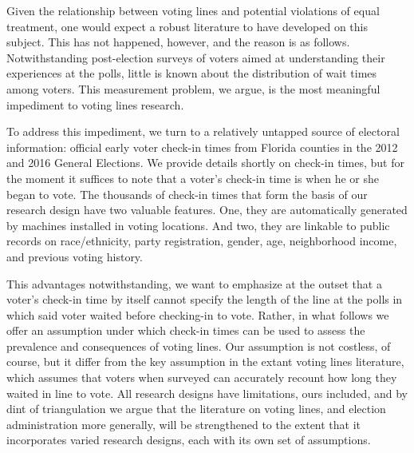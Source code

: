 \documentclass[12pt,titlepage]{article}
\begin{document}
Given the relationship between voting lines and potential violations
of equal treatment, one would expect a robust literature to
have developed on this subject.  This has not happened, however, and
the reason is as follows. Notwithstanding post-election surveys of
voters aimed at understanding their experiences at the polls, little
is known about the distribution of wait times among voters. This
measurement problem, we argue, is the most meaningful impediment to
voting lines research.

To address this impediment, we turn to a relatively untapped source of
electoral information: official early voter check-in times from
Florida counties in the 2012 and 2016 General Elections. We provide
details shortly on check-in times, but for the moment it suffices to
note that a voter's check-in time is when he or she began to vote. The
thousands of check-in times that form the basis of our research design
have two valuable features. One, they are automatically generated by
machines installed in voting locations. And two, they are linkable to
public records on race/ethnicity, party registration, gender, age,
neighborhood income, and previous voting history.

This advantages notwithstanding, we want to emphasize at the outset
that a voter's check-in time by itself cannot specify the length of
the line at the polls in which said voter waited before checking-in to
vote. Rather, in what follows we offer an assumption under which
check-in times can be used to assess the prevalence and consequences
of voting lines. Our assumption is not costless, of course, but it
differ from the key assumption in the extant voting lines literature,
which assumes that voters when surveyed can accurately recount how
long they waited in line to vote. All research designs have
limitations, ours included, and by dint of triangulation we argue that
the literature on voting lines, and election administration more
generally, will be strengthened to the extent that it incorporates
varied research designs, each with its own set of assumptions.

\end{document}
